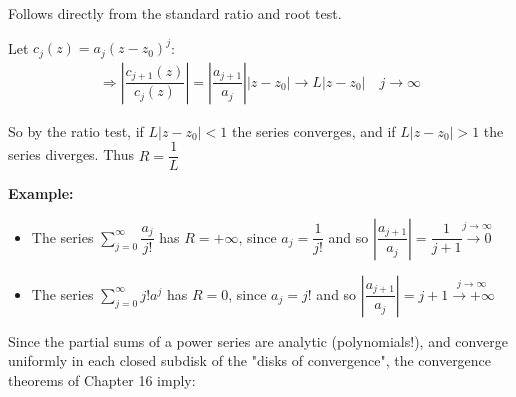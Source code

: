 \newpage
\begin{prf}[]{}
  Follows directly from the standard ratio and root test.
  \par\bigskip
  \noindent Let $c_j(z) = a_j(z-z_0)^j$:
  \begin{equation*}
    \begin{gathered}
      \Rightarrow \left|\dfrac{c_{j+1}(z)}{c_j(z)}\right| = \left|\dfrac{a_{j+1}}{a_j}\right|\left|z-z_0\right|\to L\left|z-z_0\right|\quad j\to\infty
    \end{gathered}
  \end{equation*}
  \par\bigskip
  \noindent So by the ratio test, if $L\left|z-z_0\right|<1$ the series converges, and if $L\left|z-z_0\right|>1$ the series diverges. Thus $R = \dfrac{1}{L}$
\end{prf}
\par\bigskip
\noindent\textbf{Example:}\par
\begin{itemize}[leftmargin=*]
  \item The series $\sum_{j=0}^{\infty}\dfrac{a_j}{j!}$ has $R = +\infty$, since $a_j = \dfrac{1}{j!}$ and so $\left|\dfrac{a_{j+1}}{a_j}\right| = \dfrac{1}{j+1}\stackrel{j\to\infty}{\to0}$
    \par\bigskip
  \item The series $\sum_{j=0}^{\infty}j!a^j$ has $R = 0$, since $a_j = j!$ and so $\left|\dfrac{a_{j+1}}{a_j}\right| = j+1\stackrel{j\to\infty}{\to+\infty}$
\end{itemize}
\par\bigskip
\noindent Since the partial sums of a power series are analytic (polynomials!), and converge uniformly in each closed subdisk of the "disks of convergence", the convergence theorems of Chapter 16 imply:
\par\bigskip
